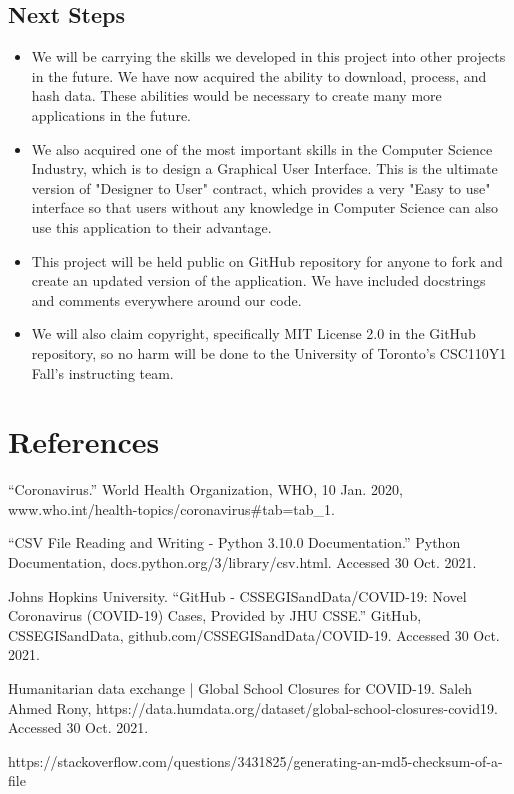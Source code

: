 \documentclass[fontsize=11pt]{article}
\begin{document}
    \subsection{Next Steps}

    \begin{itemize}
        \item We will be carrying the skills we developed in this project into other projects in the future. We have now acquired the ability to download, process, and hash data. These abilities would be necessary to create many more applications in the future.
        \item We also acquired one of the most important skills in the Computer Science Industry, which is to design a Graphical User Interface. This is the ultimate version of "Designer to User" contract, which provides a very "Easy to use" interface so that users without any knowledge in Computer Science can also use this application to their advantage.
        \item This project will be held public on GitHub repository for anyone to fork and create an updated version of the application. We have included docstrings and comments everywhere around our code.
        \item We will also claim copyright, specifically MIT License 2.0 in the GitHub repository, so no harm will be done to the University of Toronto's CSC110Y1 Fall's instructing team.
    \end{itemize}

    \newpage

    \section{References}

    ``Coronavirus.'' World Health Organization, WHO, 10 Jan. 2020, www.who.int/health-topics/coronavirus\#tab=tab\_1.

    ``CSV File Reading and Writing - Python 3.10.0 Documentation.'' Python Documentation, docs.python.org/3/library/csv.html. Accessed 30 Oct. 2021.

    Johns Hopkins University. ``GitHub - CSSEGISandData/COVID-19: Novel Coronavirus (COVID-19) Cases, Provided by JHU CSSE.'' GitHub, CSSEGISandData, github.com/CSSEGISandData/COVID-19. Accessed 30 Oct. 2021.

    Humanitarian data exchange | Global School Closures for COVID-19. Saleh Ahmed Rony, https://data.humdata.org/dataset/global-school-closures-covid19. Accessed 30 Oct. 2021.

    https://stackoverflow.com/questions/3431825/generating-an-md5-checksum-of-a-file
\end{document}
